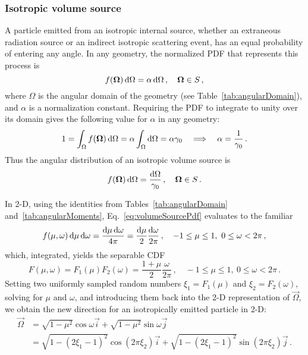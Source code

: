 \subsubsection{Isotropic volume source}
A particle emitted from an isotropic internal source, whether an extraneous
radiation source or an indirect isotropic scattering event, has an equal
probability of entering any angle. In any geometry, the normalized PDF that
represents this process is
\begin{equation*}
  f(\bm{\Omega}) \mathop{}\!\mathrm{d}\Omega = \alpha \mathop{}\!\mathrm{d}\Omega \,,
  \quad \bm{\Omega} \in S \,,
\end{equation*}
where $\Omega$ is the angular domain of the
geometry (see Table~\ref{tab:angularDomain}), and $\alpha$ is a normalization
constant.
Requiring the PDF to integrate to unity over its domain gives the
following value for $\alpha$ in any geometry:
\begin{align*}
  1 = \int_{\Omega} f(\bm{\Omega}) \mathop{}\!\mathrm{d}\Omega
  = \alpha \int_{\Omega} \mathop{}\!\mathrm{d}\Omega = \alpha \gamma_0
  \quad \Longrightarrow \quad
  \alpha = \frac{1}{\gamma_0}\,.
\end{align*}
Thus the angular distribution of an isotropic volume source is
\begin{equation}\label{eq:volumeSourcePdf}
  f(\bm{\Omega}) \mathop{}\!\mathrm{d}\Omega = \frac{\mathop{}\!\mathrm{d}\Omega}{\gamma_0} \,,
  \quad \bm{\Omega} \in S\,.
\end{equation}

In 2-D, using the identities from Tables~\ref{tab:angularDomain}
and~\ref{tab:angularMoments}, Eq.~\eqref{eq:volumeSourcePdf} evaluates to the
familiar
\begin{equation*}
  f(\mu,\omega) \mathop{}\!\mathrm{d}\mu\mathop{}\!\mathrm{d}\omega = \frac{\mathop{}\!\mathrm{d}\mu\mathop{}\!\mathrm{d}\omega}{4\pi} 
  = \frac{\mathop{}\!\mathrm{d}\mu}{2}\frac{\mathop{}\!\mathrm{d}\omega}{2\pi}
  \,,
  \quad -1\le \mu \le 1,\ 0 \le \omega < 2\pi\,,
\end{equation*}
which, integrated, yields the separable CDF
\begin{equation*}
  F(\mu,\omega) = F_1(\mu) F_2(\omega)
  = \frac{1 + \mu}{2}\frac{\omega}{2\pi}\,,
  \quad -1\le \mu \le 1,\ 0 \le \omega < 2\pi\,.
\end{equation*}
Setting two uniformly sampled random numbers $\xi_1 = F_1(\mu)$ and
$\xi_2 = F_2(\omega)$, solving for $\mu$ and $\omega$, and
introducing them back into the 2-D representation of $\vec{\Omega}$, we obtain the
new direction for an isotropically emitted particle in 2-D:
\begin{align*}
  \vec{\Omega} &= \sqrt{1-\mu^2} \cos \omega \vec{i}
  + \sqrt{1-\mu^2} \sin \omega \vec{j}
\\
  &= \sqrt{1-(2\xi_1-1)^2} \cos(2\pi\xi_2) \vec{i}
  + \sqrt{1-(2\xi_1-1)^2} \sin(2\pi\xi_2) \vec{j}\,.
\end{align*}

